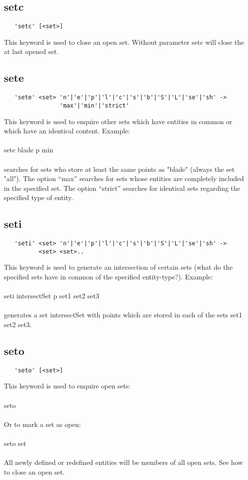 \documentclass{article}
\begin{document}
\subsection{\label{setc}setc}
\begin{verbatim}
   'setc' [<set>] 
\end{verbatim}
This keyword is used to close an open set. Without parameter setc will close the at last opened set.

\subsection{\label{sete}sete}
\begin{verbatim}
   'sete' <set> 'n'|'e'|'p'|'l'|'c'|'s'|'b'|'S'|'L'|'se'|'sh' ->
                'max'|'min'|'strict'
\end{verbatim}
This keyword is used to enquire other sets which have entities in common or which have an identical content. Example:\\\\sete blade p min\\\\ searches for sets who store at least the same points as "blade" (always the set "all"). The option ``max'' searches for sets whose entities are completely included in the specified set. The option ``strict'' searches for identical sets regarding the specified type of entity.

\subsection{\label{seti}seti}
\begin{verbatim}
   'seti' <set> 'n'|'e'|'p'|'l'|'c'|'s'|'b'|'S'|'L'|'se'|'sh' ->
          <set> <set>.. 
\end{verbatim}
This keyword is used to generate an intersection of certain sets (what do the specified sets have in common of the specified entity-type?). Example:\\\\seti intersectSet p set1 set2 set3\\\\generates a set intersectSet with points which are stored in each of the sets set1 set2 set3.

\subsection{\label{seto}seto}
\begin{verbatim}
   'seto' [<set>] 
\end{verbatim}
This keyword is used to enquire open sets:\\\\
seto\\\\
Or to mark a set as open:\\\\
seto set\\\\
All newly defined or redefined entities will be members of all open sets. See  how to close an open set.
\end{document}
